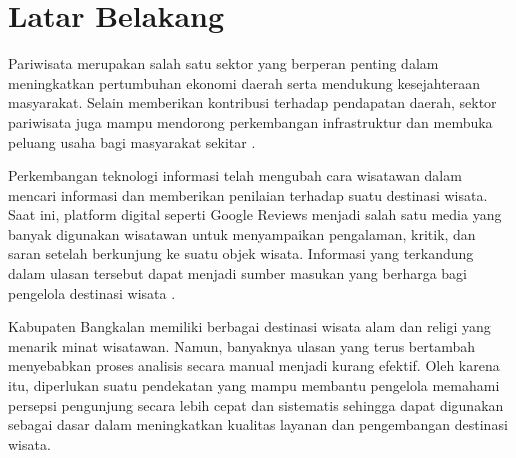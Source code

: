 \section{Latar Belakang}

Pariwisata merupakan salah satu sektor yang berperan penting dalam meningkatkan pertumbuhan ekonomi daerah serta mendukung kesejahteraan masyarakat. Selain memberikan kontribusi terhadap pendapatan daerah, sektor pariwisata juga mampu mendorong perkembangan infrastruktur dan membuka peluang usaha bagi masyarakat sekitar \cite{afendi2023}.

Perkembangan teknologi informasi telah mengubah cara wisatawan dalam mencari informasi dan memberikan penilaian terhadap suatu destinasi wisata. Saat ini, platform digital seperti Google Reviews menjadi salah satu media yang banyak digunakan wisatawan untuk menyampaikan pengalaman, kritik, dan saran setelah berkunjung ke suatu objek wisata. Informasi yang terkandung dalam ulasan tersebut dapat menjadi sumber masukan yang berharga bagi pengelola destinasi wisata \cite{ramadhani2024}.

Kabupaten Bangkalan memiliki berbagai destinasi wisata alam dan religi yang menarik minat wisatawan. Namun, banyaknya ulasan yang terus bertambah menyebabkan proses analisis secara manual menjadi kurang efektif. Oleh karena itu, diperlukan suatu pendekatan yang mampu membantu pengelola memahami persepsi pengunjung secara lebih cepat dan sistematis sehingga dapat digunakan sebagai dasar dalam meningkatkan kualitas layanan dan pengembangan destinasi wisata.